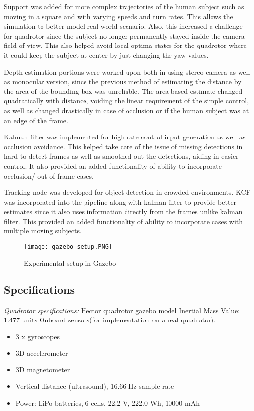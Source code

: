 Support was added for more complex trajectories of the human subject such as moving in a square and with varying speeds and turn rates. This allows the simulation
to better model real world scenario. Also, this increased a challenge for quadrotor since the subject no longer permanently stayed inside the camera field of view. This also helped avoid local optima states for the quadrotor where it could keep the subject at center by just changing the yaw values.

Depth estimation portions were worked upon both in using stereo camera as well as monocular version, since the previous method of estimating the distance by the
area of the bounding box was unreliable. The area based estimate changed quadratically with distance, voiding the linear requirement of the simple control, as well as changed drastically in case of occlusion or if the human subject was
at an edge of the frame.

Kalman filter was implemented for high rate control input generation as well as occlusion avoidance. This helped take care of the issue of missing detections in hard-to-detect frames as well as smoothed out the detections, aiding in easier control. It also provided an added functionality of ability to incorporate occlusion/ out-of-frame cases.

Tracking node was developed for object detection in crowded environments. KCF was incorporated into the pipeline along with kalman filter to provide better estimates since it also uses information directly from the frames unlike kalman filter. This provided an added functionality of ability to incorporate cases with multiple moving subjects.

\begin{figure}[htb]
	\centering
	\texttt{[image: gazebo-setup.PNG]}
	\caption{Experimental setup in Gazebo\label{Experimental setup in Gazebo}}
\end{figure}

\subsection{Specifications}
\emph{Quadrotor specifications:}
	Hector quadrotor gazebo model
	\newline Inertial Mass Value: 1.477 units
	\newline Onboard sensors(for implementation on a real quadrotor):
	\vspace{-5mm}
	\begin{itemize}
		\item 3 x gyroscopes
		\vspace{-5mm}
		\item 3D accelerometer \vspace{-5mm}
		\item 3D magnetometer \vspace{-5mm}
		\item Vertical distance (ultrasound), 16.66 Hz sample rate \vspace{-5mm}
		\item Power: LiPo batteries, 6 cells, 22.2 V, 222.0 Wh, 10000 mAh
	\end{itemize}	
	 
